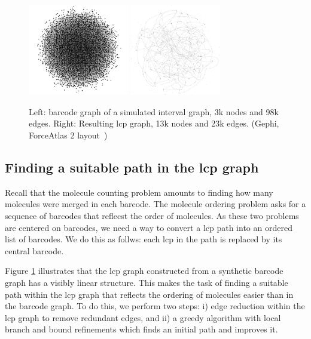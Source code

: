 \begin{figure}
\includegraphics[height=4cm]{figs/simu_0_bar_n10000_d10_m3-dev1.gexf.png}\hspace{1cm}
\includegraphics[height=4cm]{figs/simu_0_bar_n10000_d10_m3-dev1_d2_simplified_maxclq-cropped.pdf}\hspace{1cm}
    \centering
    \caption{Left: barcode graph of a simulated interval graph, 3k nodes and 98k edges. Right: Resulting lcp graph, 13k nodes and 23k edges. (Gephi, ForceAtlas 2 layout~\cite{gephi})}
    \label{fig:deconv}
\end{figure}


\subsection{Finding a suitable path in the lcp graph \label{sec:suitable_path}}

Recall that the molecule counting problem amounts to finding how many molecules were merged in each barcode. The molecule ordering problem asks for a sequence of barcodes that reflecst the order of molecules. As these two problems are centered on barcodes, we need a way to convert a lcp path into an ordered list of barcodes.  We do this as follws: each lcp in the path is replaced by its central barcode. %

Figure \ref{fig:deconv} illustrates that the lcp graph constructed from a synthetic barcode graph has a visibly linear structure. This makes the task of finding a suitable path within the lcp graph that reflects the ordering of molecules easier than in the barcode graph. 
To do this, we perform two steps: i) edge reduction within the lcp graph to remove redundant edges, and ii) a greedy algorithm with local branch and bound refinements which finds an initial path and improves it.

